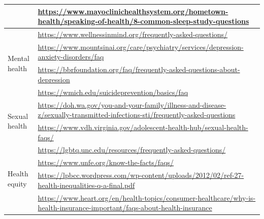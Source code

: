 \begin{table}[h]
{\begin{tabular}{ll}
    & \url{https://www.mayoclinichealthsystem.org/hometown-health/speaking-of-health/8-common-sleep-study-questions} \\
    \midrule
    \multirow{4}{*}{Mental health} & \url{https://www.wellnessinmind.org/frequently-asked-questions/} \\
    & \url{https://www.mountsinai.org/care/psychiatry/services/depression-anxiety-disorders/faq} \\
    & \url{https://bbrfoundation.org/faq/frequently-asked-questions-about-depression} \\
    & \url{https://wmich.edu/suicideprevention/basics/faq} \\
    \midrule
    \multirow{2}{*}{Sexual health} & \url{https://doh.wa.gov/you-and-your-family/illness-and-disease-z/sexually-transmitted-infections-sti/frequently-asked-questions} \\
    & \url{https://www.vdh.virginia.gov/adolescent-health-hub/sexual-health-faqs/} \\
    \midrule
    \multirow{4}{*}{Health equity} &
    \url{https://lgbtq.unc.edu/resources/frequently-asked-questions/} \\
    & \url{https://www.unfe.org/know-the-facts/faqs/} \\
    & \url{https://lpbcc.wordpress.com/wp-content/uploads/2012/02/ref-27-health-inequalities-q-a-final.pdf} \\
    & \url{https://www.heart.org/en/health-topics/consumer-healthcare/why-is-health-insurance-important/faqs-about-health-insurance} \\
    \bottomrule
    \end{tabular}
    }
    \vspace{-0.1in}
    \label{tab:test_links}
\end{table}

